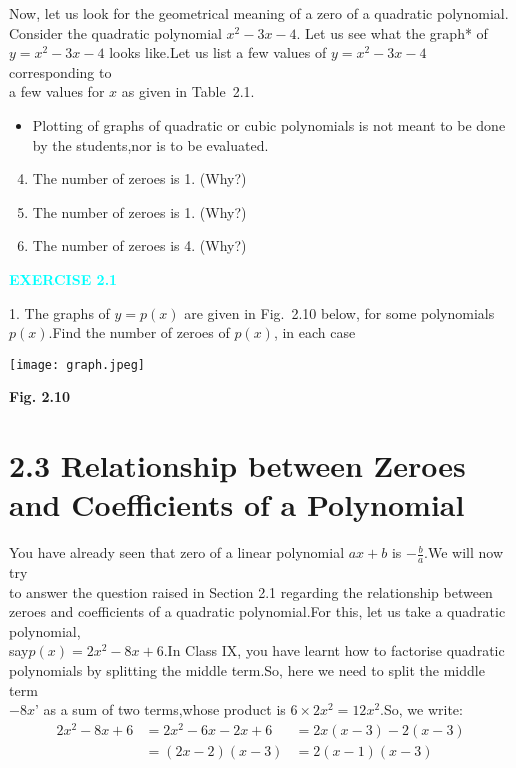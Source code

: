 \documentclass[12pt]{article}
\begin{document}
\hspace{2em}Now, let us look for the geometrical meaning of a zero of a quadratic polynomial.
\\Consider the quadratic polynomial \( x^2 - 3x - 4 \). Let us see what the graph* of\\
\( y = x^2 - 3x - 4 \) looks like.Let us list a few values of \( y = x^2 - 3x - 4 \) corresponding to\\
a few values for \( x \) as given in Table~2.1.\\
\begin{itemize}[label={\textcolor{cyan}{*}}]
    \item Plotting of graphs of quadratic or cubic polynomials is not meant to be done by the students,nor is to be evaluated.
\end{itemize}
\begin{enumerate}
\setcounter{enumi}{3}  %
\item The number of zeroes is 1. (Why?)
\item The number of zeroes is 1. (Why?)
\item The number of zeroes is 4. (Why?)
\end{enumerate}
\vspace{-1.5em}
\begin{center}
\noindent\textcolor{cyan}{\textbf{EXERCISE 2.1}}
\end{center}
1. The graphs of \( y = p(x) \) are given in Fig.~2.10 below, for some polynomials \( p(x) \).Find the number of zeroes of \( p(x) \), in each case

\texttt{[image: graph.jpeg]}
\begin{center}
\textcolor{myblue}{\textbf{Fig. 2.10}}
\end{center}
\section*{2.3 Relationship between Zeroes and Coefficients of a Polynomial}
You have already seen that zero of a linear polynomial \( ax + b \) is \( -\frac{b}{a} \).We will now try
\\to answer the question raised in Section 2.1 regarding the relationship between zeroes and coefficients of a quadratic polynomial.For this, let us take a quadratic polynomial,
\\ say\(p(x) = 2x^2 - 8x + 6.\)In Class IX, you have learnt how to factorise quadratic polynomials by splitting the middle term.So, here we need to split the middle term 
\\ \(-8x\)’ as a sum of two terms,whose product is \( 6 \times 2x^2 = 12x^2 \).So, we write:
\begin{align*}2x^2 - 8x + 6 &= 2x^2 - 6x - 2x + 6 &= 2x(x - 3) - 2(x - 3) \\
              &= (2x - 2)(x - 3)&= 2(x - 1)(x - 3)
\end{align*}
\end{document}
